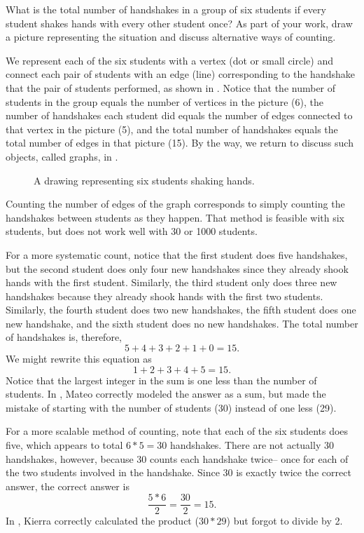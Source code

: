 \begin{exam} 
\label{exam_hs6}  
    What is the total number of handshakes in a group of six students if every student shakes hands with every other student once?  As part of your work, draw a picture representing the situation and discuss alternative ways of counting.
        \begin{soln}
            We represent each of the six students with a vertex (dot or small circle) and connect each pair of students with an edge (line) corresponding to the handshake that the pair of students performed, as shown in .  Notice that the number of students in the group equals the number of vertices in the picture (6), the number of handshakes each student did equals the number of edges connected to that vertex in the picture (5), and the total number of handshakes equals the total number of edges in that picture (15).  By the way, we  return to discuss such objects, called graphs, in  \chgraphthy.

                \begin{figure}[hbtp]
                    \centering
                    
                    \caption{A drawing representing six students shaking hands.}
                    \label{fig_K6}
                \end{figure}

            Counting the number of edges of the graph corresponds to simply counting the handshakes between students as they happen.  That method is feasible with six students, but does not work well with 30 or 1000 students.  
        
            For a more systematic count, notice that the first student does five handshakes, but the second student does only four new handshakes since they already shook hands with the first student.  Similarly, the third student only does three new handshakes because they already shook hands with the first two students.  Similarly, the fourth student does two new handshakes, the fifth student does one new handshake, and the sixth student does no new handshakes.  The total number of handshakes is, therefore,
                $$5+4+3+2+1+0=15.$$
            We might rewrite this equation as
                $$1+2+3+4+5=15.$$
            Notice that the largest integer in the sum is one less than the number of students.  In , Mateo correctly modeled the answer as a sum, but made the mistake of starting with the number of students (30) instead of one less (29).

            For a more scalable method of counting, note that each of the six students does five, which appears to total $6*5=30$ handshakes.  There are not actually 30 handshakes, however, because 30 counts each handshake twice-- once for each of the two students involved in the handshake.  Since 30 is exactly twice the correct answer, the correct answer is $$\frac{5*6}{2} = \frac{30}{2} = 15.$$  In , Kierra correctly calculated the product ($30*29$) but forgot to divide by 2.
        \end{soln}
\end{exam}

